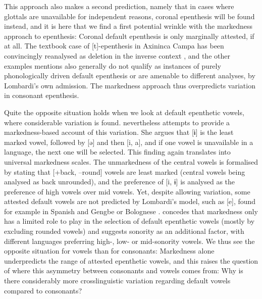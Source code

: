 \documentclass[output=paper,colorlinks,citecolor=brown]{langscibook}
\begin{document}
This approach also makes a second prediction, namely that in cases where glottals are unavailable for independent reasons, coronal epenthesis will be found instead, and it is here that we find a first potential wrinkle with the markedness approach to epenthesis: Coronal default epenthesis is only marginally attested, if at all. The textbook case of [t]-epenthesis in Axininca Campa has been convincingly reanalysed as deletion in the inverse context \citep{staro15}, and the other examples \citet{lombardi02} mentions also generally do not qualify as instances of purely phonologically driven default epenthesis or are amenable to different analyses, by Lombardi's own admission. The markedness approach thus overpredicts variation in consonant epenthesis.

Quite the opposite situation holds when we look at default epenthetic vowels, where considerable variation is found. \citet{lombardi03} nevertheless attempts to provide a markedness-based account of this variation. She argues that [ɨ] is the least marked vowel, followed by [ə] and then [i, a], and if one vowel is unavailable in a language, the next one will be selected. This finding again translates into universal markedness scales. The unmarkedness of the central vowels is formalised by stating that [+back, --round] vowels are least marked (central vowels being analysed as back unrounded), and the preference of [i, ɨ] is analysed as the preference of high vowels over mid vowels. Yet, despite allowing variation, some attested default vowels are not predicted by Lombardi's model, such as [e], found for example in Spanish and Gengbe \citep{Archangeli1988, abaglo-archangeli} or Bolognese . \citet{delacy06} concedes that markedness only has a limited role to play in the selection of default epenthetic vowels (mostly by excluding rounded vowels) and suggests sonority as an additional factor, with different languages preferring high-, low- or mid-sonority vowels. We thus see the opposite situation for vowels than for consonants: Markedness alone underpredicts the range of attested epenthetic vowels, and this raises the question of where this asymmetry between consonants and vowels comes from: Why is there considerably more crosslinguistic variation regarding default vowels compared to consonants?
\end{document}
